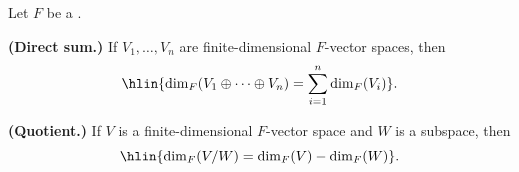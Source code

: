 \begin{proposition} \label{proposition:dimension_formula_for_direct_sum_and_quotient_spaces}
    Let $F$ be a .

    \textbf{(Direct sum.)} If $V_1, \dots, V_n$ are finite-dimensional $F$-vector spaces, then
    $$\hlin{\dim_F(V_1 \oplus \cdots \oplus V_n) = \sum_{i=1}^n \dim_F(V_i)}.$$

    \textbf{(Quotient.)} If $V$ is a finite-dimensional $F$-vector space and $W$ is a subspace, then
    $$\hlin{\dim_F(V/W) = \dim_F(V) - \dim_F(W)}.$$

\end{proposition}
